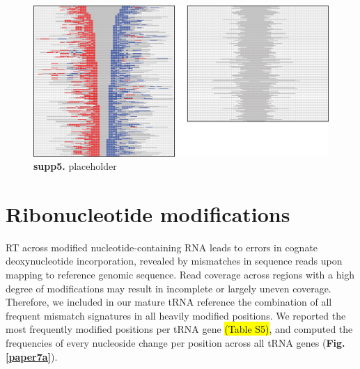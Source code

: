 \documentclass[12pt]{rockefeller}
\begin{document}
\begin{figure}[!ht]%
\centering
\includegraphics[width=\textwidth]{supp5.png}%
\caption[supp5]
{\textbf{supp5.}
placeholder}
\centering
\label{supp5}%
\end{figure}

\section{Ribonucleotide modifications}\label{modifications}

RT across modified nucleotide-containing RNA leads to errors in cognate deoxynucleotide incorporation, revealed by mismatches in sequence reads upon mapping to reference genomic sequence. Read coverage across regions with a high degree of modifications may result in incomplete or largely uneven coverage. Therefore, we included in our mature tRNA reference the combination of all frequent mismatch signatures in all heavily modified positions. We reported the most frequently modified positions per tRNA gene \hl{(Table S5)}, and computed the frequencies of every nucleoside change per position across all tRNA genes (\textbf{Fig. \ref{paper7a}}). 
\end{document}

